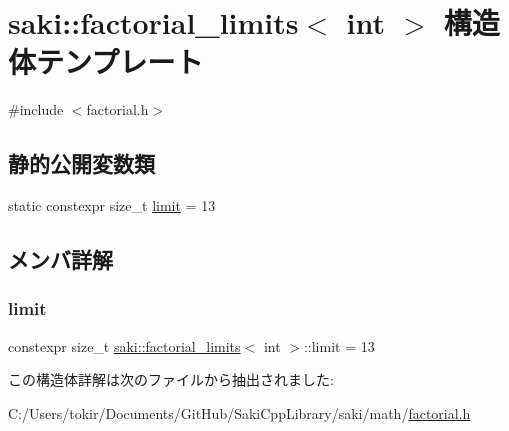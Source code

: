 \hypertarget{structsaki_1_1factorial__limits_3_01int_01_4}{}\section{saki\+:\+:factorial\+\_\+limits$<$ int $>$ 構造体テンプレート}
\label{structsaki_1_1factorial__limits_3_01int_01_4}


{\ttfamily \#include $<$factorial.\+h$>$}

\subsection*{静的公開変数類}
\begin{DoxyCompactItemize}
\item 
static constexpr size\+\_\+t \mbox{\hyperlink{structsaki_1_1factorial__limits_3_01int_01_4_a8015f9b9c2d1e4549f2870c70e973b95}{limit}} = 13
\end{DoxyCompactItemize}


\subsection{メンバ詳解}
\mbox{\label{structsaki_1_1factorial__limits_3_01int_01_4_a8015f9b9c2d1e4549f2870c70e973b95}} 
\subsubsection{\texorpdfstring{limit}{limit}}
{\footnotesize\ttfamily constexpr size\+\_\+t \mbox{\hyperlink{structsaki_1_1factorial__limits}{saki\+::factorial\+\_\+limits}}$<$ int $>$\+::limit = 13\hspace{0.3cm}{\ttfamily [static]}}



この構造体詳解は次のファイルから抽出されました\+:\begin{DoxyCompactItemize}
\item 
C\+:/\+Users/tokir/\+Documents/\+Git\+Hub/\+Saki\+Cpp\+Library/saki/math/\mbox{\hyperlink{factorial_8h}{factorial.\+h}}\end{DoxyCompactItemize}
